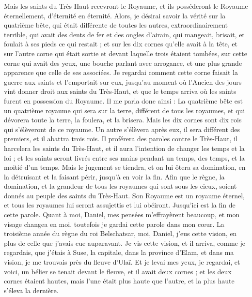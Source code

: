 \begin{multicols}{2}
Mais les saints du Très-Haut recevront le Royaume, et ils posséderont le Royaume éternellement, d'éternité en éternité.
Alors, je désirai savoir la vérité sur la quatrième bête, qui était différente de toutes les autres, extraordinairement terrible, qui avait des dents de fer et des ongles d'airain, qui mangeait, brisait, et foulait à ses pieds ce qui restait ;
et sur les dix cornes qu'elle avait à la tête, et sur l'autre corne qui était sortie et devant laquelle trois étaient tombées, sur cette corne qui avait des yeux, une bouche parlant avec arrogance, et une plus grande apparence que celle de ses associées.
Je regardai comment cette corne faisait la guerre aux saints et l'emportait sur eux,
jusqu'au moment où l'Ancien des jours vint donner droit aux saints du Très-Haut, et que le temps arriva où les saints furent en possession du Royaume.
Il me parla donc ainsi : La quatrième bête est un quatrième royaume qui sera sur la terre, différent de tous les royaumes, et qui dévorera toute la terre, la foulera, et la brisera.
Mais les dix cornes sont dix rois qui s'élèveront de ce royaume. Un autre s'élèvera après eux, il sera différent des premiers, et il abattra trois rois.
Il proférera des paroles contre le Très-Haut, il harcelera les saints du Très-Haut, et il aura l'intention de changer les temps et la loi ; et les saints seront livrés entre ses mains pendant un temps, des temps, et la moitié d'un temps.
Mais le jugement se tiendra, et on lui ôtera sa domination, en la détruisant et la faisant périr, jusqu'à en voir la fin.
Afin que le règne, la domination, et la grandeur de tous les royaumes qui sont sous les cieux, soient donnés au peuple des saints du Très-Haut. Son Royaume est un royaume éternel, et tous les royaumes lui seront assujettis et lui obéiront.
Jusqu'ici est la fin de cette parole. Quant à moi, Daniel, mes pensées m'effrayèrent beaucoup, et mon visage changea en moi, toutefois je gardai cette parole dans mon cœur.
\VerseOne{}La troisième année du règne du roi Belschatsar, moi, Daniel, j'eus cette vision, en plus de celle que j'avais eue auparavant.
Je vis cette vision, et il arriva, comme je regardais, que j'étais à Suse, la capitale, dans la province d'Elam, et dans ma vision, je me trouvais près du fleuve d'Ulaï.
Et je levai mes yeux, je regardai, et voici, un bélier se tenait devant le fleuve, et il avait deux cornes ; et les deux cornes étaient hautes, mais l'une était plus haute que l'autre, et la plus haute s'éleva la dernière.

\end{multicols}
